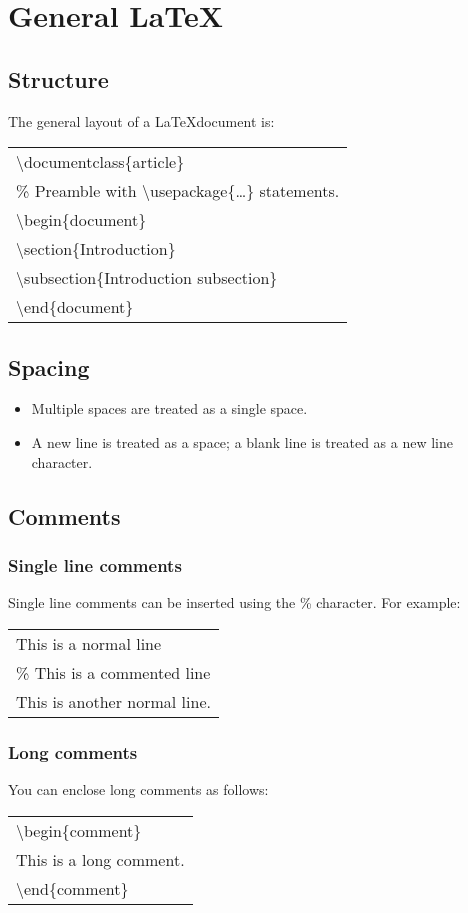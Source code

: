 \section{General \LaTeX}
\subsection{Structure}
The general layout of a \LaTeX document is:

\begin{tabular}{|p{8.0cm}|}
\hline

\textbackslash{}documentclass\{article\} \\
\% Preamble with \textbackslash{}usepackage\{\ldots\} statements. \\
\textbackslash{}begin\{document\} \\
\textbackslash{}section\{Introduction\} \\
\textbackslash{}subsection\{Introduction subsection\} \\
\textbackslash{}end\{document\} \\

\hline
\end{tabular}

\subsection{Spacing}
\begin{itemize}
\item Multiple spaces are treated as a single space.
\item A new line is treated as a space; a blank line is treated as a new line character.
\end{itemize}

\subsection{Comments}
\subsubsection{Single line comments}
Single line comments can be inserted using the \% character.
For example:

\begin{tabular}{|p{8.0cm}|}
\hline
This is a normal line \\
\% This is a commented line \\
This is another normal line. \\
\hline
\end{tabular}

\subsubsection{Long comments}
You can enclose long comments as follows:

\begin{tabular}{|p{8.0cm}|}
\hline
\textbackslash{}begin\{comment\} \\
This is a long comment. \\
\textbackslash{}end\{comment\} \\
\hline
\end{tabular}














